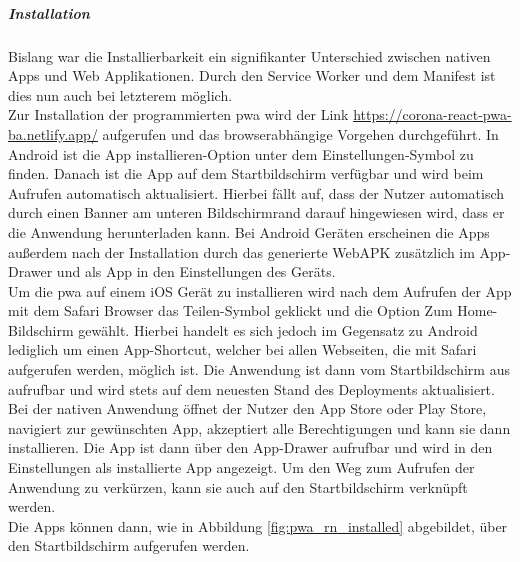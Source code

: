 \subparagraph{Installation\\}
Bislang war die Installierbarkeit ein signifikanter Unterschied zwischen nativen Apps und Web Applikationen.
Durch den Service Worker und dem Manifest ist dies nun auch bei letzterem möglich.\\
Zur Installation der programmierten \ac{pwa} wird der Link \url{https://corona-react-pwa-ba.netlify.app/} aufgerufen und das browserabhängige Vorgehen durchgeführt.
In Android ist die \glqq App installieren\grqq{}-Option unter dem Einstellungen-Symbol zu finden.
Danach ist die App auf dem Startbildschirm verfügbar und wird beim Aufrufen automatisch aktualisiert.
Hierbei fällt auf, dass der Nutzer automatisch durch einen Banner am unteren Bildschirmrand darauf hingewiesen wird, dass er die Anwendung herunterladen kann.
Bei Android Geräten erscheinen die Apps außerdem nach der Installation durch das generierte WebAPK zusätzlich im App-Drawer und als App in den Einstellungen des Geräts.\\
Um die \ac{pwa} auf einem iOS Gerät zu installieren wird nach dem Aufrufen der App mit dem Safari Browser das Teilen-Symbol geklickt und die Option \glqq Zum Home-Bildschirm\grqq{} gewählt.
Hierbei handelt es sich jedoch im Gegensatz zu Android lediglich um einen App-Shortcut, welcher bei allen Webseiten, die mit Safari aufgerufen werden, möglich ist.
Die Anwendung ist dann vom Startbildschirm aus aufrufbar und wird stets auf dem neuesten Stand des Deployments aktualisiert.\\
Bei der nativen Anwendung öffnet der Nutzer den App Store oder Play Store, navigiert zur gewünschten App, akzeptiert alle Berechtigungen und kann sie dann installieren.
Die App ist dann über den App-Drawer aufrufbar und wird in den Einstellungen als installierte App angezeigt.
Um den Weg zum Aufrufen der Anwendung zu verkürzen, kann sie auch auf den Startbildschirm verknüpft werden.\\
Die Apps können dann, wie in Abbildung \ref{fig:pwa_rn_installed} abgebildet, über den Startbildschirm aufgerufen werden.

